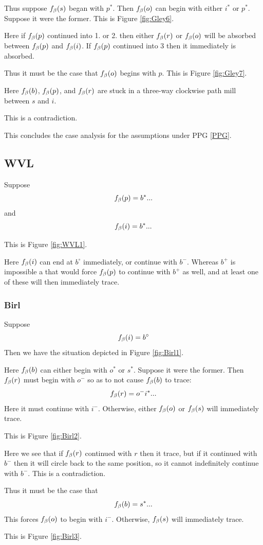 Thus suppose $f_\beta(s)$ began with $p^*$. Then $f_\beta(o)$ can begin with either $i^*$ or $p^*$. Suppose it were the former. This is Figure \ref{fig:Gley6}.

Here if $f_\beta(p)$ continued into 1. or 2. then either $f_\beta(r)$ or $f_\beta(o)$ will be absorbed between $f_\beta(p)$ and $f_\beta(i)$. If $f_\beta(p)$ continued into 3 then it immediately is absorbed.

Thus it must be the case that $f_\beta(o)$ begins with $p$. This is Figure \ref{fig:Gley7}. 

Here $f_\beta(b)$, $f_\beta(p)$, and $f_\beta(r)$ are stuck in a three-way clockwise path mill between $s$ and $i$.

This is a contradiction.

This concludes the case analysis for the assumptions under PPG \ref{PPG}.

\subsection{WVL}\label{WVL}
Suppose 
$$f_\beta(p) = b^*...$$
and 
$$f_\beta(i) = b^*...$$

This is Figure \ref{fig:WVL1}.

Here $f_\beta(i)$ can end at $b^\circ$ immediately, or continue with $b^-$. Whereas $b^+$ is impossible a that would force $f_\beta(p)$ to continue with $b^+$ as well, and at least one of these will then immediately trace.

\subsubsection{Birl}\label{Birl}
Suppose
$$f_\beta(i) = b^\circ$$
Then we have the situation depicted in Figure \ref{fig:Birl1}. 

Here $f_\beta(b)$ can either begin with $o^*$ or $s^*$. Suppose it were the former. Then $f_\beta(r)$ must begin with $o^-$ so as to not cause $f_\beta(b)$ to trace:
$$f_\beta(r) = o^- i^*...$$
Here it must continue with $i^-$. Otherwise, either  $f_\beta(o)$ or $f_\beta(s)$ will immediately trace.

This is Figure \ref{fig:Birl2}.

Here we see that if $f_\beta(r)$ continued with $r$ then it trace, but if it continued with $b^-$ then it will circle back to the same position, so it cannot indefinitely continue with $b^-$. This is a contradiction.

Thus it must be the case that 
$$f_\beta(b) = s^*...$$
This forces $f_\beta(o)$ to begin with $i^-$. Otherwise, $f_\beta(s)$ will immediately trace.

This is Figure \ref{fig:Birl3}.

